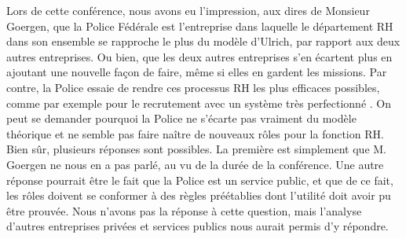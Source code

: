 Lors de cette conférence, nous avons eu l'impression, aux dires de Monsieur Goergen, que la Police Fédérale est l'entreprise dans laquelle le département RH dans son ensemble se rapproche le plus du modèle d'Ulrich, par rapport aux deux autres entreprises. Ou bien, que les deux autres entreprises s'en écartent plus en ajoutant une nouvelle façon de faire, même si elles en gardent les missions. Par contre, la Police essaie de rendre ces processus RH les plus efficaces possibles, comme par exemple pour le recrutement avec un système très perfectionné . On peut se demander pourquoi la Police ne s'écarte pas vraiment du modèle théorique et ne semble pas faire naître de nouveaux rôles pour la fonction RH. Bien sûr, plusieurs réponses sont possibles. La première est simplement que M. Goergen ne nous en a pas parlé, au vu de la durée de la conférence. Une autre réponse pourrait être le fait que la Police est un service public, et que de ce fait, les rôles doivent se conformer à des règles préétablies dont l'utilité doit avoir pu être prouvée. Nous n'avons pas la réponse à cette question, mais l'analyse d'autres entreprises privées et services publics nous aurait permis d'y répondre. \newline




 
